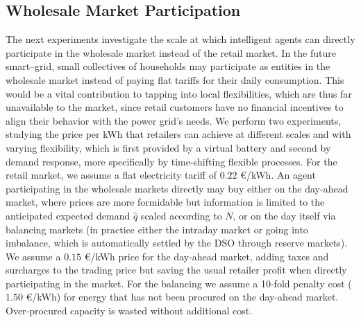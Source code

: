 \documentclass[conference]{IEEEtran}
\begin{document}

\subsection{Wholesale Market Participation}

The next experiments investigate the scale at which intelligent agents can directly participate in the wholesale market instead of the retail market. In the future smart--grid, small collectives of households may participate as entities in the wholesale market instead of paying flat tariffs for their daily consumption. This would be a vital contribution to tapping into local flexibilities, which are thus far unavailable to the market, since retail customers have no financial incentives to align their behavior with the power grid's needs.
We perform two experiments, studying the price per kWh that retailers can achieve at different scales and with varying flexibility, which is first provided by a virtual battery and second by demand response, more specifically by time-shifting flexible processes. For the retail market, we assume a flat electricity tariff of $0.22$ \euro/kWh. An agent participating in the wholesale markets directly may buy either on the day-ahead market, where prices are more formidable but information is limited to the anticipated expected demand $\hat q$ scaled according to $N$, or on the day itself via balancing markets (in practice either the intraday market or going into imbalance, which is automatically settled by the DSO through reserve markets). We assume a $0.15$ \euro/kWh price for the day-ahead market, adding taxes and surcharges to the trading price but saving the usual retailer profit when directly participating in the market. For the balancing we assume a 10-fold penalty cost ($1.50$ \euro/kWh) for energy that has not been procured on the day-ahead market. Over-procured capacity is wasted without additional cost.
\end{document}
